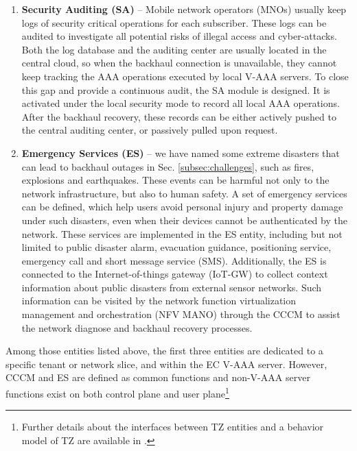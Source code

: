 \documentclass{ieeeaccess}
\begin{document}
\begin{enumerate}
		\item \textbf{Security Auditing (SA)} --
		Mobile network operators (MNOs) usually keep logs of security critical operations for each subscriber. These logs can be audited to investigate all potential risks of illegal access and cyber-attacks. Both the log database and the auditing center are usually located in the central cloud, so when the backhaul connection is unavailable, they cannot keep tracking the AAA operations executed by local V-AAA servers. To close this gap and provide a continuous audit, the SA module is designed. It is activated under the local security mode to record all local AAA operations. After the backhaul recovery, these records can be either actively pushed to the central auditing center, or passively pulled upon request.
		\item \textbf{Emergency Services (ES)} --
		we have named some extreme disasters that can lead to backhaul outages in Sec. \ref{subsec:challenges}, such as fires, explosions and earthquakes. These events can be harmful not only to the network infrastructure, but also to human safety. A set of emergency services can be defined, which help users avoid personal injury and property damage under such disasters, even when their devices cannot be authenticated by the network. These services are implemented in the ES entity, including but not limited to public disaster alarm, evacuation guidance, positioning service, emergency call and short message service (SMS). Additionally, the ES is connected to the Internet-of-things gateway (IoT-GW) to collect context information about public disasters from external sensor networks. Such information can be visited by the network function virtualization management and orchestration (NFV MANO) through the CCCM to assist the network diagnose and backhaul recovery processes.
	\end{enumerate}
	Among those entities listed above, the first three entities are dedicated to a specific tenant or network slice, and within the EC V-AAA server. However, CCCM and ES are defined as common functions and non-V-AAA server functions exist on both control plane and user plane\footnote{Further details about the interfaces between TZ entities and a behavior model of TZ are available in \cite{han2017security}.}
	
\end{document}
